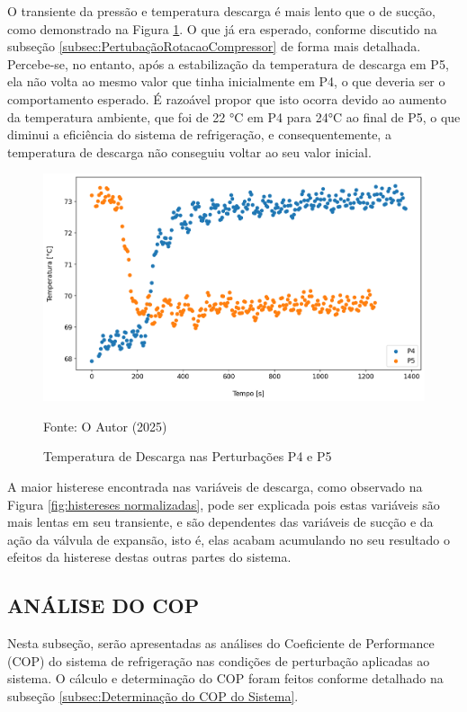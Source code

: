 O transiente da pressão e temperatura descarga é mais lento que o de sucção, como demonstrado na Figura \ref{fig:TempDescargaSubidaeDescida}. O que já era esperado, conforme discutido na subseção \ref{subsec:PertubaçãoRotacaoCompressor} de forma mais detalhada.
Percebe-se, no entanto, após a estabilização da temperatura de descarga em P5, ela não volta ao mesmo valor que tinha inicialmente em P4, o que deveria ser o comportamento esperado. É razoável propor que isto ocorra devido ao aumento da temperatura ambiente, que foi de 22 °C em P4 para 24°C ao final de P5, o que diminui a eficiência do sistema de refrigeração, e consequentemente, a temperatura de descarga não conseguiu voltar ao seu valor inicial.
\newpage
\begin{figure}[h]
    \centering
    \includegraphics[width=1\linewidth]{FigurasdoTexto/Temperatura de Descarga.png}
    \caption{Temperatura de Descarga  nas Perturbações P4 e P5}
    \label{fig:TempDescargaSubidaeDescida}
    {\footnotesize Fonte: O Autor (2025)}
\end{figure}

A maior histerese encontrada nas variáveis de descarga, como observado na Figura \ref{fig:histereses normalizadas}, pode ser explicada pois estas variáveis são mais lentas em seu transiente, e são dependentes das variáveis de sucção e da ação da válvula de expansão, isto é, elas acabam acumulando no seu resultado o efeitos da histerese destas outras partes do sistema. 

\subsection{\MakeUppercase{Análise do COP}}

Nesta subseção, serão apresentadas as análises do Coeficiente de Performance (COP) do sistema de refrigeração nas condições de perturbação aplicadas ao sistema. O cálculo e determinação do COP foram feitos conforme detalhado na subseção \ref{subsec:Determinação do COP do Sistema}.

